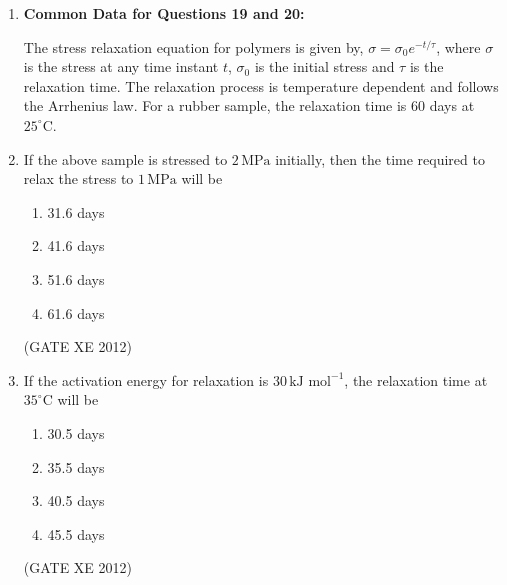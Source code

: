 \documentclass[12pt]{article}
\begin{document}
\begin{enumerate}
\begin{multicols}{2}
\begin{enumerate}
\item $1.64 \times 10^4 \, \text{g mol}^{-1}$
\item $1.74 \times 10^4 \, \text{g mol}^{-1}$
\item $1.84 \times 10^4 \, \text{g mol}^{-1}$
\item $1.94 \times 10^4 \, \text{g mol}^{-1}$
\end{enumerate}
\end{multicols}
(GATE XE 2012)



\item[] \textbf{Common Data for Questions 19 and 20:}  

The stress relaxation equation for polymers is given by, $\sigma = \sigma_0 e^{-t/\tau}$, where $\sigma$ is the stress at any time instant $t$, $\sigma_0$ is the initial stress and $\tau$ is the relaxation time. The relaxation process is temperature dependent and follows the Arrhenius law. For a rubber sample, the relaxation time is $60$ days at $25^{\circ}\text{C}$.  


\item If the above sample is stressed to $2 \, \text{MPa}$ initially, then the time required to relax the stress to $1 \, \text{MPa}$ will be  

\begin{multicols}{2}
\begin{enumerate}
\item 31.6 days
\item 41.6 days
\item 51.6 days
\item 61.6 days
\end{enumerate}
\end{multicols}
(GATE XE 2012)

\item If the activation energy for relaxation is $30 \, \text{kJ mol}^{-1}$, the relaxation time at $35^{\circ}\text{C}$ will be  

\begin{multicols}{2}
\begin{enumerate}
\item 30.5 days
\item 35.5 days
\item 40.5 days
\item 45.5 days
\end{enumerate}
\end{multicols}
(GATE XE 2012)


\end{enumerate}
\end{document}
